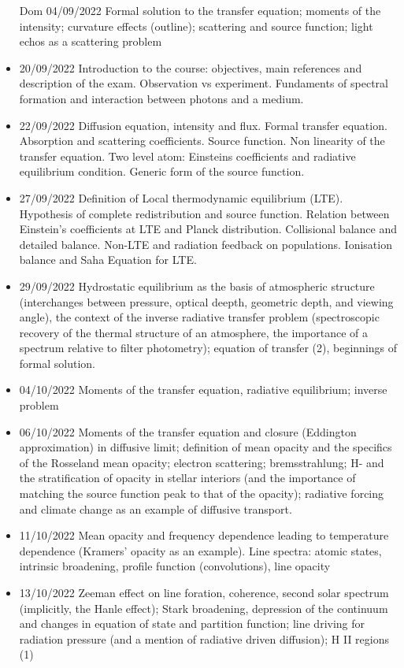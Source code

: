 \begin{itemize}

    Dom 04/09/2022 Formal solution to the transfer equation; moments of the intensity; curvature effects (outline); scattering and source function; light echos as a scattering problem 
    \item 20/09/2022 Introduction to the course: objectives, main references and description of the exam. Observation vs experiment. Fundaments of spectral formation and interaction between photons and a medium. 
    \item 22/09/2022 Diffusion equation, intensity and flux. Formal transfer equation. Absorption and scattering coefficients. Source function. Non linearity of the transfer equation. Two level atom: Einsteins coefficients and radiative equilibrium condition. Generic form of the source function. 
    \item 27/09/2022 Definition of Local thermodynamic equilibrium (LTE). Hypothesis of complete redistribution and source function. Relation between Einstein's coefficients at LTE and Planck distribution. Collisional balance and detailed balance. Non-LTE and radiation feedback on populations. Ionisation balance and Saha Equation for LTE. 
    \item 29/09/2022 Hydrostatic equilibrium as the basis of atmospheric structure (interchanges between pressure, optical deepth, geometric depth, and viewing angle), the context of the inverse radiative transfer problem (spectroscopic recovery of the thermal structure of an atmosphere, the importance of a spectrum relative to filter photometry); equation of transfer (2), beginnings of formal solution. 
    \item 04/10/2022 Moments of the transfer equation, radiative equilibrium; inverse problem 
    \item 06/10/2022 Moments of the transfer equation and closure (Eddington approximation) in diffusive limit; definition of mean opacity and the specifics of the Rosseland mean opacity; electron scattering; bremsstrahlung; H- and the stratification of opacity in stellar interiors (and the importance of matching the source function peak to that of the opacity); radiative forcing and climate change as an example of diffusive transport. 
    \item 11/10/2022 Mean opacity and frequency dependence leading to temperature dependence (Kramers' opacity as an example). Line spectra: atomic states, intrinsic broadening, profile function (convolutions), line opacity 
    \item 13/10/2022 Zeeman effect on line foration, coherence, second solar spectrum (implicitly, the Hanle effect); Stark broadening, depression of the continuum and changes in equation of state and partition function; line driving for radiation pressure (and a mention of radiative driven diffusion); H II regions (1) 

\end{itemize}
